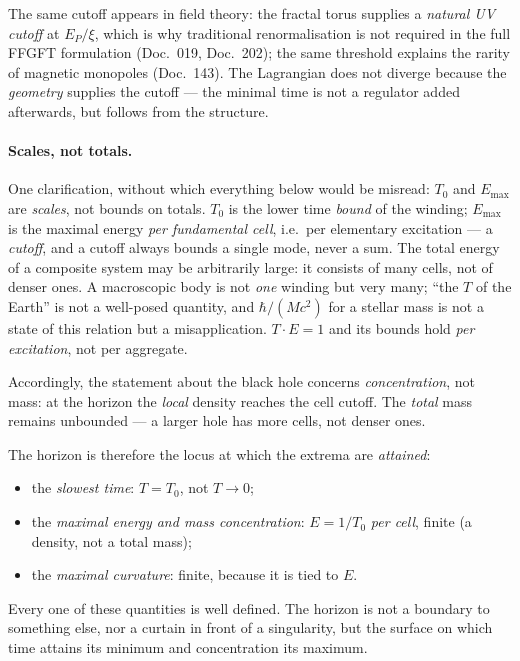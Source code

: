 The same cutoff appears in field theory: the fractal torus supplies a \emph{natural UV cutoff} at
$E_P/\xi$, which is why traditional renormalisation is not required in the full FFGFT formulation
(Doc.~019, Doc.~202); the same threshold explains the rarity of magnetic monopoles (Doc.~143). The
Lagrangian does not diverge because the \emph{geometry} supplies the cutoff --- the minimal time is
not a regulator added afterwards, but follows from the structure.

\paragraph{Scales, not totals.} One clarification, without which everything below would be
misread: $T_0$ and $E_\text{max}$ are \emph{scales}, not bounds on totals. $T_0$ is the lower time
\emph{bound} of the winding; $E_\text{max}$ is the maximal energy \emph{per fundamental cell},
i.e.\ per elementary excitation --- a \emph{cutoff}, and a cutoff always bounds a single mode, never
a sum. The total energy of a composite system may be arbitrarily large: it consists of many cells,
not of denser ones. A macroscopic body is not \emph{one} winding but very many; \enquote{the $T$ of
the Earth} is not a well-posed quantity, and $\hbar/(M c^2)$ for a stellar mass is not a state of
this relation but a misapplication. $T\cdot E = 1$ and its bounds hold \emph{per excitation}, not
per aggregate.

Accordingly, the statement about the black hole concerns \emph{concentration}, not mass: at the
horizon the \emph{local} density reaches the cell cutoff. The \emph{total} mass remains unbounded ---
a larger hole has more cells, not denser ones.

The horizon is therefore the locus at which the extrema are \emph{attained}:
\begin{itemize}
\item the \emph{slowest time}: $T = T_0$, not $T \to 0$;
\item the \emph{maximal energy and mass concentration}: $E = 1/T_0$ \emph{per cell}, finite
(a density, not a total mass);
\item the \emph{maximal curvature}: finite, because it is tied to $E$.
\end{itemize}
Every one of these quantities is well defined. The horizon is not a boundary to something else,
nor a curtain in front of a singularity, but the surface on which time attains its minimum and
concentration its maximum.


